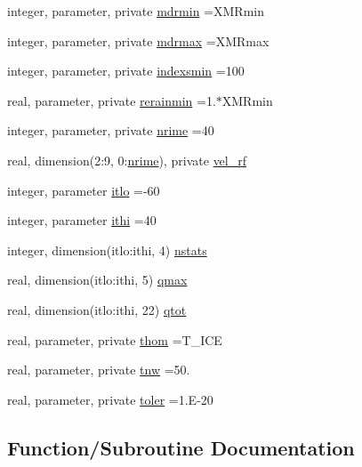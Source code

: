 \begin{DoxyCompactItemize}
\item 
integer, parameter, private \hyperlink{namespacemodule__microphysics_aa9201f3dba87b517d0fe88af177c4281}{mdrmin} =X\+M\+Rmin
\item 
integer, parameter, private \hyperlink{namespacemodule__microphysics_aa21f2a4aa4dc086cbe80493ae7da6b8b}{mdrmax} =X\+M\+Rmax
\item 
integer, parameter, private \hyperlink{namespacemodule__microphysics_a48966fa99ac5a7268ef5f473a675eeb2}{indexsmin} =100
\item 
real, parameter, private \hyperlink{namespacemodule__microphysics_a86f747f0e2a77aee3a2c8270a0f2fc6d}{rerainmin} =1.$\ast$X\+M\+Rmin
\item 
integer, parameter, private \hyperlink{namespacemodule__microphysics_aaea427462ab04c90a0e8188c08e102c2}{nrime} =40
\item 
real, dimension(2\+:9, 0\+:\hyperlink{namespacemodule__microphysics_aaea427462ab04c90a0e8188c08e102c2}{nrime}), private \hyperlink{namespacemodule__microphysics_a2979744b6713e1ea75813ce1329967c6}{vel\+\_\+rf}
\item 
integer, parameter \hyperlink{namespacemodule__microphysics_ada649157311835e0fa4c4d24057d5aa4}{itlo} =-\/60
\item 
integer, parameter \hyperlink{namespacemodule__microphysics_aac47e36935bcfaf088e6d0cb266d74f5}{ithi} =40
\item 
integer, dimension(itlo\+:ithi, 4) \hyperlink{namespacemodule__microphysics_a8893b7e5e0d04741a7e155c999480f92}{nstats}
\item 
real, dimension(itlo\+:ithi, 5) \hyperlink{namespacemodule__microphysics_ae783e9f9007b2cc25590b9e967461ef7}{qmax}
\item 
real, dimension(itlo\+:ithi, 22) \hyperlink{namespacemodule__microphysics_a1ca8e1d6e01d0b1bfb406608ccfeff5d}{qtot}
\item 
real, parameter, private \hyperlink{namespacemodule__microphysics_ae6cb25c6ef4d76e53988a1390c99bacb}{thom} =T\+\_\+\+I\+CE
\item 
real, parameter, private \hyperlink{namespacemodule__microphysics_a7759795319d20ea93e3ceb6755333fa1}{tnw} =50.
\item 
real, parameter, private \hyperlink{namespacemodule__microphysics_a14f276771aea75d768df7e65c93e0092}{toler} =1.\+E-\/20
\end{DoxyCompactItemize}


\subsection{Function/\+Subroutine Documentation}
